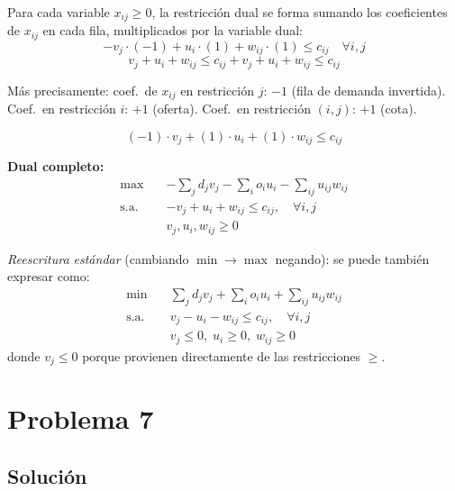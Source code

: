 \documentclass{article}
\begin{document}
Para cada variable $x_{ij}\geq0$, la restricción dual se forma sumando los coeficientes de $x_{ij}$ en cada fila, multiplicados por la variable dual:
$$-v_j\cdot(-1)+u_i\cdot(1)+w_{ij}\cdot(1)\leq c_{ij}\quad\forall i,j$$
$$\boxed{v_j+u_i+w_{ij}\leq c_{ij}+v_j+u_i+w_{ij}\leq c_{ij}}$$

Más precisamente: coef.\ de $x_{ij}$ en restricción $j$: $-1$ (fila de demanda invertida). Coef.\ en restricción $i$: $+1$ (oferta). Coef.\ en restricción $(i,j)$: $+1$ (cota).

$$(-1)\cdot v_j + (1)\cdot u_i + (1)\cdot w_{ij} \leq c_{ij}$$

\textbf{Dual completo:}
$$\begin{aligned}
\max\quad &-\sum_j d_j v_j - \sum_i o_i u_i - \sum_{ij}u_{ij}w_{ij}\\
\text{s.a.}\quad &-v_j+u_i+w_{ij}\leq c_{ij},\quad\forall i,j\\
&v_j,u_i,w_{ij}\geq0
\end{aligned}$$

\textit{Reescritura estándar} (cambiando $\min\to\max$ negando): se puede también expresar como:
$$\begin{aligned}
\min\quad &\sum_j d_j v_j + \sum_i o_i u_i + \sum_{ij}u_{ij}w_{ij}\\
\text{s.a.}\quad &v_j - u_i - w_{ij}\leq c_{ij},\quad\forall i,j\\
&v_j \leq 0,\;u_i\geq0,\;w_{ij}\geq0
\end{aligned}$$
donde $v_j\leq0$ porque provienen directamente de las restricciones $\geq$.

\newpage
\section*{Problema 7}

\subsection*{Solución}
\end{document}

